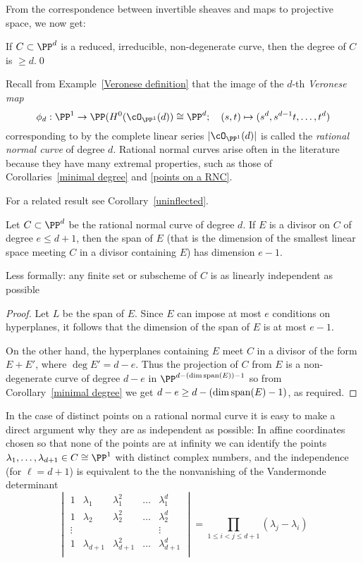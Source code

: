 From the correspondence between invertible sheaves and maps to projective space, we now get:
\begin{corollary}\label{minimal degree}
If $C\subset \PP^d$ is a reduced, irreducible, non-degenerate curve, then the degree of $C$ is $\geq d$.\qed
\end{corollary}

Recall from Example~\ref{Veronese definition} that the image of the $d$-th \emph{Veronese map}  
$$
\phi_d: \PP^1 \to \PP(H^0(\cO_{\PP^1}(d)) \cong \PP^d; \quad (s,t) \mapsto (s^d, s^{d-1}t, \dots, t^d)
$$
corresponding to by the complete linear series $|\cO_{\PP^1}(d)|$ is called the \emph{rational normal curve} of degree $d$. Rational normal curves arise often in the literature because they have many extremal properties, such as those of Corollaries~\ref{minimal degree} and \ref{points on a RNC}.

For a related result see Corollary~\ref{uninflected}.

\begin{corollary}\label{independence of points on a RNC}
Let $C\subset \PP^d$ be the rational normal curve of degree $d$. If $E$ is a divisor on $C$ of degree $e\leq d+1$, then the
span of $E$ (that is the dimension of the smallest linear space meeting $C$ in a divisor containing $E$) has dimension $e-1$.
\end{corollary}
Less formally: any finite set or subscheme of $C$ is as linearly independent as possible

\begin{proof}
Let $L$ be the span of $E$. Since $E$ can impose at most $e$ conditions on hyperplanes, it follows that the dimension of the span of $E$ is
at most $e-1$.

On the other hand, the hyperplanes containing $E$ meet $C$ in a divisor of the form $E+E'$, where
$\deg E' = d-e$. Thus the projection of $C$ from $E$ is a non-degenerate curve of degree $d-e$ in $\PP^{d-(\dim {\rm span}(E))-1}$
so from Corollary~\ref{minimal degree} we get $d-e \geq d-(\dim {\rm span}(E)-1)$, as required.
\end{proof}

In the case of distinct points on a rational normal curve
it is easy to make a direct argument why they are as independent as possible: In affine coordinates chosen so that none of the points are
at infinity we can identify the points $\lambda_1,\dots,\lambda_{d+1} \in C \cong \PP^1$ with distinct complex numbers, and the independence (for $\ell = d+1$) is equivalent to the the nonvanishing of the Vandermonde determinant
$$
\begin{vmatrix}
1 & \lambda_1 & \lambda_1^2 & \dots & \lambda_1^d \\
1 & \lambda_2 & \lambda_2^2 & \dots & \lambda_2^d \\
\vdots & & & & \vdots \\
1 & \lambda_{d+1} & \lambda_{d+1}^2 & \dots & \lambda_{d+1}^d \\
\end{vmatrix}
= \prod_{1 \leq i < j \leq d+1} (\lambda_j - \lambda_i)
$$


